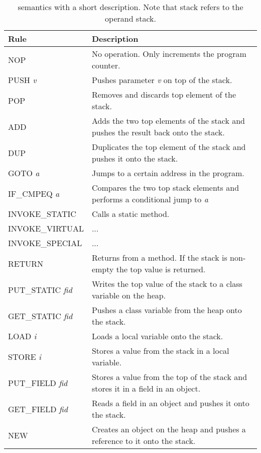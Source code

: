 \subsection{\jcl}
\begin{table}[H]
\centering
\label{tab:instr}
\begin{tabular}{p{}|p{}}
\textbf{Rule}			  & \textbf{Description} \\ \hline
NOP             		  & No operation. Only increments the program counter. \\ \hline
PUSH \textit{v}           & Pushes parameter \textit{v} on top of the stack. \\ \hline
POP             		  & Removes and discards top element of the stack.\\ \hline
ADD             		  & Adds the two top elements of the stack and pushes the result back onto the stack.  \\ \hline
DUP             		  & Duplicates the top element of the stack and pushes it onto the stack. \\ \hline
GOTO \textit{a}           & Jumps to a certain address in the program.  \\ \hline
IF\_CMPEQ \textit{a}   	  & Compares the two top stack elements and performs a conditional jump to \textit{a}  \\ \hline
INVOKE\_STATIC     		  & Calls a static method.  \\ \hline
INVOKE\_VIRTUAL 		  & ...  \\ \hline
INVOKE\_SPECIAL			  & ...  \\ \hline
RETURN                    & Returns from a method. If the stack is non-empty the top value is returned.   \\ \hline
PUT\_STATIC \textit{fid}  & Writes the top value of the stack to a class variable on the heap.  \\ \hline
GET\_STATIC \textit{fid}  & Pushes a class variable from the heap onto the stack. \\ \hline
LOAD \textit{i}           & Loads a local variable onto the stack.  \\ \hline
STORE \textit{i}          & Stores a value from the stack in a local variable.\\ \hline
PUT\_FIELD \textit{fid}   & Stores a value from the top of the stack and stores it in a field in an object.   \\ \hline
GET\_FIELD \textit{fid}	  & Reads a field in an object and pushes it onto the stack. \\ \hline
NEW   		              & Creates an object on the heap and pushes a reference to it onto the stack.  \\ \hline  
\end{tabular}
\caption{\jcl semantics with a short description. Note that stack refers to the operand stack.}
\end{table}